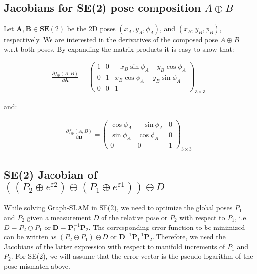 \documentclass[a4paper,11pt]{report}
\newcommand{\A}{{\mathbf{A}}}
\newcommand{\B}{{\mathbf{B}}}
\newcommand{\D}{{\mathbf{D}}}
\newcommand{\Pone}{\mathbf{P}_1}
\newcommand{\Ptwo}{\mathbf{P}_2}
\begin{document}
\subsection{Jacobians for SE(2) pose composition $A \oplus B$}
\label{sect:se2.jacob_AB}

Let $\mathbf{A}, \mathbf{B} \in \mathbf{SE}(2)$ be the 2D poses 
$(x_A,y_A,\phi_A)$, 
and
$(x_B,y_B,\phi_B)$, respectively. 
We are interested in the derivatives of the composed pose $A \oplus B$ w.r.t both poses. 
By expanding the matrix products it is easy to show that: 

\begin{eqnarray}
\label{eq:se2.dAB_dA}
\frac{\partial f_\oplus(A,B)}{\partial \A}
=
\left(
\begin{array}{ccc}
1 & 0 & -x_B \sin \phi_A - y_B \cos \phi_A \\
0 & 1 &  x_B \cos \phi_A - y_B \sin \phi_A \\
0 & 0 & 1
\end{array}
\right)_{3 \times 3}
\end{eqnarray}

\noindent and:

\begin{eqnarray}
\label{eq:se2.dAB_dB}
\frac{\partial f_\oplus(A,B)}{\partial \B}
=
\left(
\begin{array}{ccc}
\cos \phi_A & -\sin \phi_A & 0  \\
\sin \phi_A & \cos \phi_A & 0 \\
0 & 0 & 1
\end{array}
\right)_{3 \times 3}
\end{eqnarray}

\subsection{SE(2) Jacobian of $((P_2 \oplus e^{\varepsilon 2}) \ominus (P_1 \oplus e^{\varepsilon 1})) \ominus D$}
\label{sect:se2:jacob.DinvP2invP2}

While solving Graph-SLAM in SE(2), we need to optimize the global poses $P_1$ and $P_2$ given a measurement $D$ of the relative pose or $P_2$ with respect to $P_1$, i.e.  $D=P_2 \ominus P_1$ or $\D = \Pone^{-1} \Ptwo$.
The corresponding error function to be minimized can be written as $(P_2 \ominus P_1) \ominus D$ or $\D^{-1} \Pone^{-1} \Ptwo$.
Therefore, we need the Jacobians of the latter expression with respect to 
manifold increments of $P_1$ and $P_2$. 
For SE(2), we will assume that the error vector is the pseudo-logarithm of the pose mismatch above.
\end{document}
